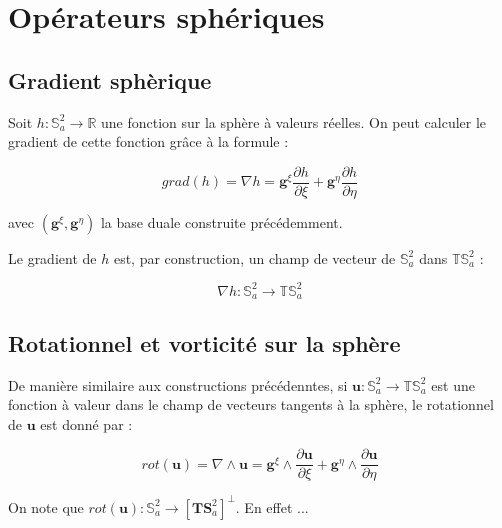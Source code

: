 
\chapter{Opérateurs sphériques}


\section{Gradient sphèrique}

Soit $h : \mathbb{S}^2_a \rightarrow \mathbb{R}$ une fonction sur la sphère à valeurs réelles. On peut calculer le gradient de cette fonction grâce à la formule :

\begin{equation}
grad(h) = \nabla h = \mathbf{g}^{\xi} \dfrac{\partial h}{\partial \xi} + \mathbf{g}^{\eta} \dfrac{\partial h}{\partial \eta}
\label{eq:gradient}
\end{equation}

avec $(\mathbf{g}^{\xi}, \mathbf{g}^{\eta})$ la base duale construite précédemment.

\begin{remarque}
Le gradient de $h$ est, par construction, un champ de vecteur de $\mathbb{S}^2_a$ dans $\mathbb{T}\mathbb{S}^2_a$ :

\begin{equation}
\nabla h : \mathbb{S}^2_a \rightarrow \mathbb{T}\mathbb{S}^2_a
\end{equation}
\end{remarque}


\section{Rotationnel et vorticité sur la sphère}

De manière similaire aux constructions précédenntes, si $\mathbf{u} : \mathbb{S}^2_a \rightarrow \mathbb{T} \mathbb{S}^2_a$ est une fonction à valeur dans le champ de vecteurs tangents à la sphère, le rotationnel de $\mathbf{u}$ est donné par :

\begin{equation}
rot( \mathbf{u} ) = \nabla \wedge \mathbf{u} = \mathbf{g}^{\xi} \wedge \dfrac{\partial \mathbf{u}}{\partial \xi} + \mathbf{g}^{\eta} \wedge \dfrac{\partial \mathbf{u}}{\partial \eta}
\label{eq:rotationnel}
\end{equation}

On note que $rot( \mathbf{u} ) : \mathbb{S}^2_a \rightarrow \left[ \mathbf{T} \mathbf{S}^2_a \right]^{\bot}$. En effet ... 

